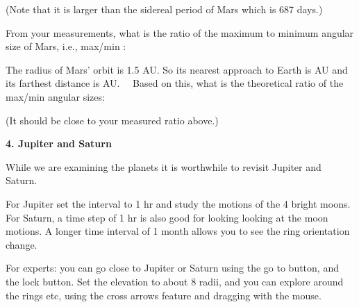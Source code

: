 \documentclass[12pt]{article}
\begin{document}
\noindent
(Note that it is larger than the sidereal period of Mars which is 687
days.)

\medskip\noindent
From your measurements, what is the ratio of the maximum to minimum
angular size of Mars, i.e., max/min :\makebox[4cm]{\hrulefill}

\medskip\noindent
The radius of Mars' orbit is 1.5 AU. So its nearest approach to Earth is
\makebox[
1cm]{\hrulefill} AU and its farthest distance is
\makebox[1cm]{\hrulefill} AU. \ \
Based on this, what is the theoretical ratio of the max/min angular
sizes:\makebox[1cm]{\hrulefill}

\noindent
(It should be close to your measured ratio above.)


\bigskip
\noindent
{\bf 4. Jupiter and Saturn}

\medskip
While we are examining the planets it is worthwhile to revisit Jupiter
and Saturn.

\medskip
For Jupiter set the interval to 1 hr and study the motions of the 4
bright moons. For Saturn, a time step of 1 hr is also good for looking
looking at the moon motions. A longer time interval of 1 month allows
you to see the ring orientation change.

\medskip
For experts: you can go close to Jupiter or Saturn using the go to
button, and the lock button. Set the elevation to about 8 radii, and
you can explore around the rings etc, using the cross arrows feature
and dragging with the mouse.

\medskip
\noindent
\end{document}

